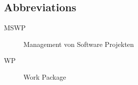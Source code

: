 \documentclass[a4paper,11pt]{article}
\begin{document}
\begin{appendix}

\pagebreak

{}




\pagebreak

\section*{Abbreviations}
 
 \begin{description}
  \item[MSWP] Management von Software Projekten
  \item[WP] Work Package
 \end{description}

\end{appendix}
\end{document}
